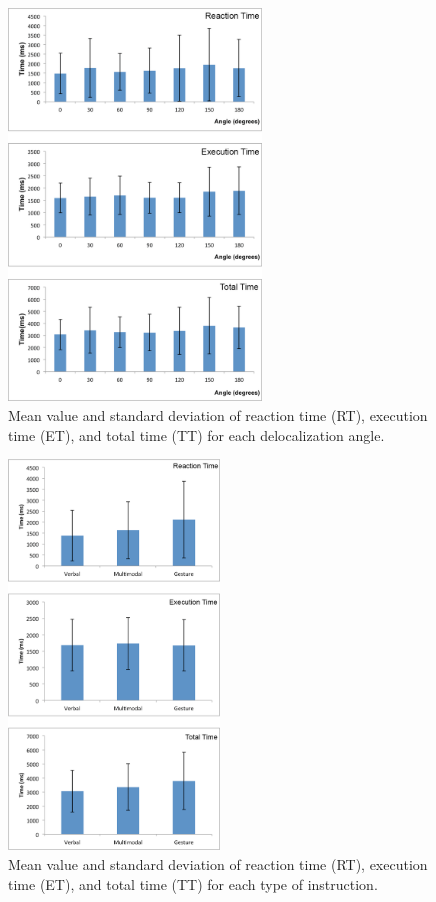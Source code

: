 \begin{figure}[htb]
  \centering
  \includegraphics[width=0.6\textwidth]{figures/ch3/angles}
  \caption{\label{fig:3_angles}Mean value and standard deviation of reaction time (RT), execution time (ET), and total time (TT) for each delocalization angle.}
\end{figure}

\begin{figure}[htb]
  \centering
  \includegraphics[width=0.5\textwidth]{figures/ch3/instruction}
  \caption{\label{fig:3_instruction}Mean value and standard deviation of reaction time (RT), execution time (ET), and total time (TT) for each type of instruction.}
\end{figure}

